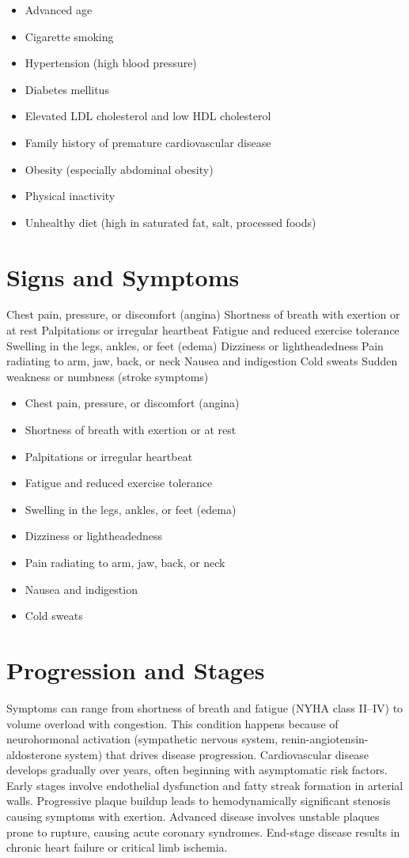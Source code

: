 \begin{itemize}[noitemsep]
  \item Advanced age
  \item Cigarette smoking
  \item Hypertension (high blood pressure)
  \item Diabetes mellitus
  \item Elevated LDL cholesterol and low HDL cholesterol
  \item Family history of premature cardiovascular disease
  \item Obesity (especially abdominal obesity)
  \item Physical inactivity
  \item Unhealthy diet (high in saturated fat, salt, processed foods)
\end{itemize}
\section{Signs and Symptoms}
Chest pain, pressure, or discomfort (angina) Shortness of breath with exertion or at rest Palpitations or irregular heartbeat Fatigue and reduced exercise tolerance Swelling in the legs, ankles, or feet (edema) Dizziness or lightheadedness Pain radiating to arm, jaw, back, or neck Nausea and indigestion Cold sweats Sudden weakness or numbness (stroke symptoms)

\begin{itemize}[noitemsep]
  \item Chest pain, pressure, or discomfort (angina)
  \item Shortness of breath with exertion or at rest
  \item Palpitations or irregular heartbeat
  \item Fatigue and reduced exercise tolerance
  \item Swelling in the legs, ankles, or feet (edema)
  \item Dizziness or lightheadedness
  \item Pain radiating to arm, jaw, back, or neck
  \item Nausea and indigestion
  \item Cold sweats
\end{itemize}
\section{Progression and Stages}
Symptoms can range from shortness of breath and fatigue (NYHA class II--IV) to volume overload with congestion. This condition happens because of neurohormonal activation (sympathetic nervous system, renin-angiotensin-aldosterone system) that drives disease progression. Cardiovascular disease develops gradually over years, often beginning with asymptomatic risk factors. Early stages involve endothelial dysfunction and fatty streak formation in arterial walls. Progressive plaque buildup leads to hemodynamically significant stenosis causing symptoms with exertion. Advanced disease involves unstable plaques prone to rupture, causing acute coronary syndromes. End-stage disease results in chronic heart failure or critical limb ischemia.

